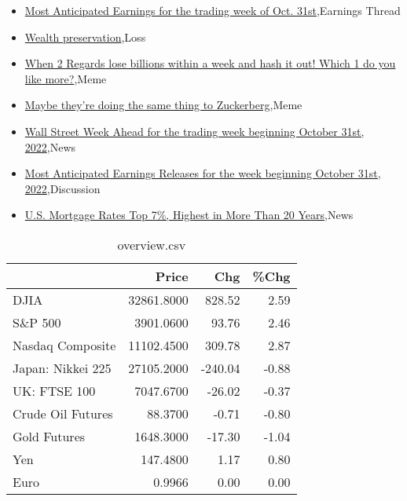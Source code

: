 \documentclass{article}%
\begin{document}
%
\begin{itemize}%
\item%
\href{https://reddit.com/r/wallstreetbets/comments/ygi0c1/most\_anticipated\_earnings\_for\_the\_trading\_week\_of/}{Most Anticipated Earnings for the trading week of Oct. 31st},Earnings Thread%
\item%
\href{https://reddit.com/r/wallstreetbets/comments/ygh3vn/wealth\_preservation/}{Wealth preservation},Loss%
\item%
\href{https://reddit.com/r/wallstreetbets/comments/yggxpq/when\_2\_regards\_lose\_billions\_within\_a\_week\_and/}{When 2 Regards lose billions within a week and hash it out! Which 1 do you like more?},Meme%
\item%
\href{https://reddit.com/r/wallstreetbets/comments/ygfqm4/maybe\_theyre\_doing\_the\_same\_thing\_to\_zuckerberg/}{Maybe they're doing the same thing to Zuckerberg},Meme%
\item%
\href{https://reddit.com/r/StockMarket/comments/ygiwkp/wall\_street\_week\_ahead\_for\_the\_trading\_week/}{Wall Street Week Ahead for the trading week beginning October 31st, 2022},News%
\item%
\href{https://reddit.com/r/StockMarket/comments/ygi2m0/most\_anticipated\_earnings\_releases\_for\_the\_week/}{Most Anticipated Earnings Releases for the week beginning October 31st, 2022},Discussion%
\item%
\href{https://reddit.com/r/Economics/comments/yghafp/us\_mortgage\_rates\_top\_7\_highest\_in\_more\_than\_20/}{U.S. Mortgage Rates Top 7\%, Highest in More Than 20 Years},News%
\end{itemize}%


\begin{table}[htbp]%
\caption{overview.csv}%
\centering%
\begin{adjustbox}{width=1\textwidth}%
\begin{tabular}{lrrr}
\toprule
                  &      Price &     Chg &  \%Chg \\
\midrule
             DJIA & 32861.8000 &  828.52 &  2.59 \\
          S\&P 500 &  3901.0600 &   93.76 &  2.46 \\
 Nasdaq Composite & 11102.4500 &  309.78 &  2.87 \\
Japan: Nikkei 225 & 27105.2000 & -240.04 & -0.88 \\
     UK: FTSE 100 &  7047.6700 &  -26.02 & -0.37 \\
Crude Oil Futures &    88.3700 &   -0.71 & -0.80 \\
     Gold Futures &  1648.3000 &  -17.30 & -1.04 \\
              Yen &   147.4800 &    1.17 &  0.80 \\
             Euro &     0.9966 &    0.00 &  0.00 \\
\bottomrule
\end{tabular}
%
\end{adjustbox}%
\end{table}
\end{document}
